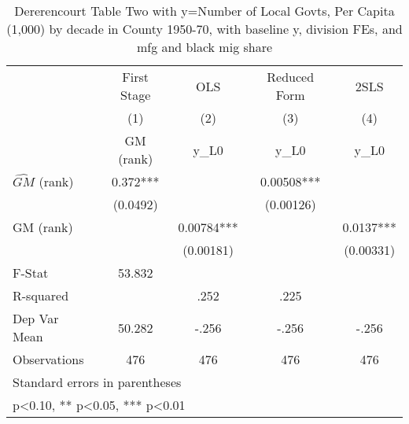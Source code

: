 \begin{table}[htbp]\centering
\def\sym#1{\ifmmode^{#1}\else\(^{#1}\)\fi}
\caption{Dererencourt Table Two with y=Number of Local Govts, Per Capita (1,000) by decade in County 1950-70, with baseline y, division FEs, and mfg and black mig share}
\begin{tabular}{l*{4}{c}}
\toprule
                    & First Stage   &         OLS   &Reduced Form   &        2SLS   \\
                    &\multicolumn{1}{c}{(1)}&\multicolumn{1}{c}{(2)}&\multicolumn{1}{c}{(3)}&\multicolumn{1}{c}{(4)}\\
                    &\multicolumn{1}{c}{GM  (rank)}&\multicolumn{1}{c}{y\_L0}&\multicolumn{1}{c}{y\_L0}&\multicolumn{1}{c}{y\_L0}\\
\midrule
$\hat{GM}$ (rank)   &       0.372***&               &     0.00508***&               \\
                    &    (0.0492)   &               &   (0.00126)   &               \\
\addlinespace
GM  (rank)          &               &     0.00784***&               &      0.0137***\\
                    &               &   (0.00181)   &               &   (0.00331)   \\
\midrule
F-Stat              &      53.832   &               &               &               \\
R-squared           &               &        .252   &        .225   &               \\
Dep Var Mean        &      50.282   &       -.256   &       -.256   &       -.256   \\
Observations        &         476   &         476   &         476   &         476   \\
\bottomrule
\multicolumn{5}{l}{\footnotesize Standard errors in parentheses}\\
\multicolumn{5}{l}{\footnotesize * p<0.10, ** p<0.05, *** p<0.01}\\
\end{tabular}
\end{table}
